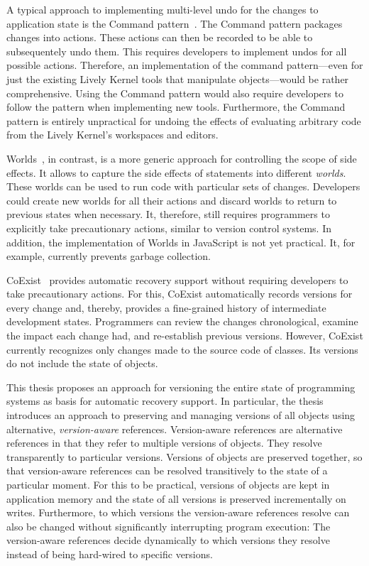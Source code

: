 A typical approach to implementing multi-level undo for the changes to application state is the Command pattern~\cite{GammaHelmJohnsonVlissides95}.
The Command pattern packages changes into actions.
These actions can then be recorded to be able to subsequentely undo them.
This requires developers to implement undos for all possible actions.
Therefore, an implementation of the command pattern---even for just the existing Lively Kernel tools that manipulate objects---would be rather comprehensive.
Using the Command pattern would also require developers to follow the pattern when implementing new tools.
Furthermore, the Command pattern is entirely unpractical for undoing the effects of evaluating arbitrary code from the Lively Kernel's workspaces and editors.

Worlds~\cite{Warth2011Wor,Warth2009PhD}, in contrast, is a more generic approach for controlling the scope of side effects.
It allows to capture the side effects of statements into different \emph{worlds}.
These worlds can be used to run code with particular sets of changes.
Developers could create new worlds for all their actions and discard worlds to return to previous states when necessary.
It, therefore, still requires programmers to explicitly take precautionary actions, similar to version control systems.
In addition, the implementation of Worlds in JavaScript is not yet practical.
It, for example, currently prevents garbage collection.

CoExist~\cite{Steinert2012COE,Steinert2014EVA} provides automatic recovery support without requiring developers to take precautionary actions.
For this, CoExist automatically records versions for every change and, thereby, provides a fine-grained history of intermediate development states.
Programmers can review the changes chronological, examine the impact each change had, and re-establish previous versions.
However, CoExist currently recognizes only changes made to the source code of classes.
Its versions do not include the state of objects.

This thesis proposes an approach for versioning the entire state of programming systems as basis for automatic recovery support.
In particular, the thesis introduces an approach to preserving and managing versions of all objects using alternative, \emph{version-aware} references.
Version-aware references are alternative references in that they refer to multiple versions of objects.
They resolve transparently to particular versions.
Versions of objects are preserved together, so that version-aware references can be resolved transitively to the state of a particular moment.
For this to be practical, versions of objects are kept in application memory and the state of all versions is preserved incrementally on writes.
Furthermore, to which versions the version-aware references resolve can also be changed without significantly interrupting program execution:
The version-aware references decide dynamically to which versions they resolve instead of being hard-wired to specific versions.

